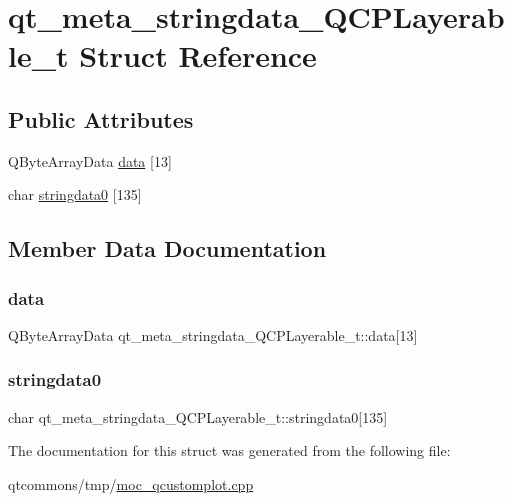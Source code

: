 \hypertarget{structqt__meta__stringdata___q_c_p_layerable__t}{}\section{qt\+\_\+meta\+\_\+stringdata\+\_\+\+Q\+C\+P\+Layerable\+\_\+t Struct Reference}
\label{structqt__meta__stringdata___q_c_p_layerable__t}
\subsection*{Public Attributes}
\begin{DoxyCompactItemize}
\item 
Q\+Byte\+Array\+Data \mbox{\hyperlink{structqt__meta__stringdata___q_c_p_layerable__t_adaa7771b25eb1d5dc6cb97526d7a4995}{data}} \mbox{[}13\mbox{]}
\item 
char \mbox{\hyperlink{structqt__meta__stringdata___q_c_p_layerable__t_a63a3660ec480a3586f023e4d498cee3d}{stringdata0}} \mbox{[}135\mbox{]}
\end{DoxyCompactItemize}


\subsection{Member Data Documentation}
\mbox{\label{structqt__meta__stringdata___q_c_p_layerable__t_adaa7771b25eb1d5dc6cb97526d7a4995}} 
\subsubsection{\texorpdfstring{data}{data}}
{\footnotesize\ttfamily Q\+Byte\+Array\+Data qt\+\_\+meta\+\_\+stringdata\+\_\+\+Q\+C\+P\+Layerable\+\_\+t\+::data\mbox{[}13\mbox{]}}

\mbox{\label{structqt__meta__stringdata___q_c_p_layerable__t_a63a3660ec480a3586f023e4d498cee3d}} 
\subsubsection{\texorpdfstring{stringdata0}{stringdata0}}
{\footnotesize\ttfamily char qt\+\_\+meta\+\_\+stringdata\+\_\+\+Q\+C\+P\+Layerable\+\_\+t\+::stringdata0\mbox{[}135\mbox{]}}



The documentation for this struct was generated from the following file\+:\begin{DoxyCompactItemize}
\item 
qtcommons/tmp/\mbox{\hyperlink{moc__qcustomplot_8cpp}{moc\+\_\+qcustomplot.\+cpp}}\end{DoxyCompactItemize}
